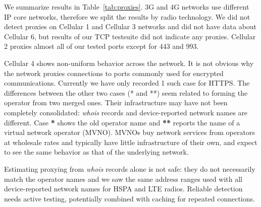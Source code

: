 \documentclass{sig-alternate-10pt}
\begin{document}
We summarize results in Table~\ref{tab:proxies}. 3G and 4G networks use different IP core networks, therefore we split the results by radio technology. We did not detect proxies on Cellular 1 and Cellular 3 networks and did not have data about Cellular 6, but results of our TCP testsuite did not indicate any proxies. Cellular 2 proxies almost all of our tested ports except for 443 and 993.

Cellular 4 shows non-uniform behavior across the network. It is not obvious why the network proxies connections to ports commonly used for encrypted communications. Currently we have only recorded 1 such case for HTTPS. The differences between the other two cases (* and **) seem related to forming the operator from two merged ones. Their infrastructure may have not been completely consolidated: \emph{whois} records and device-reported network names are different. Case \textbf{*} shows the old operator name and \textbf{**} reports the name of a virtual network operator (MVNO). MVNOs buy network services from operators at wholesale rates and typically have little infrastructure of their own, and expect to see the same behavior as that of the underlying network.

Estimating proxying from \emph{whois} records alone is not safe: they do not necessarily match the operator names and we saw the same address ranges used with all device-reported network names for HSPA and LTE radios. Reliable detection needs active testing, potentially combined with caching for repeated connections. 

\end{document}
